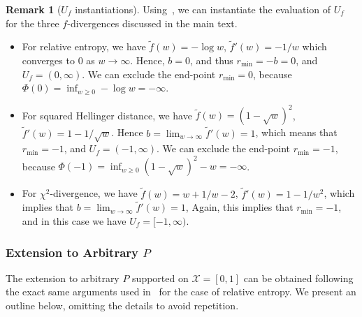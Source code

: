 \documentclass{article}
\theoremstyle{plain}
\theoremstyle{definition}
\newtheorem{remark}[remark]{Remark}
\newcommand{\calX}{\mathcal X}
\newcommand{\ftilde}{\widetilde{f}}
\begin{document}
\begin{remark}[$U_f$ instantiations]
    \label{remark:Uf-examples} 
    Using~, we can instantiate the evaluation of $U_f$ for the three $f$-divergences discussed in the main text. 
    \begin{itemize}
        \item For relative entropy, we have $\ftilde(w) = - \log w$, $\ftilde'(w) = -1/w$ which converges to $0$ as $w \to \infty$. Hence, $b = 0$, and thus $r_{\min} = - b = 0$, and $U_f = (0, \infty)$. We can exclude the end-point $r_{\min}=0$, because $\Phi(0) = \inf_{w \geq 0} - \log w = -\infty$. 

        \item For squared Hellinger distance, we have $\ftilde(w) = (1-\sqrt{w})^2$, $\ftilde'(w)= 1 - 1/\sqrt{w}$. Hence $b = \lim_{ w \to \infty} \ftilde'(w) = 1$, which means that $r_{\min} = -1$, and $U_f = (-1, \infty)$. We can exclude the end-point $r_{\min}=-1$, because $\Phi(-1) = \inf_{w \geq 0} (1-\sqrt{w})^2 - w = -\infty$. 
        
        \item For $\chi^2$-divergence, we have $\ftilde(w) = w + 1/w - 2$, $\ftilde'(w) = 1 - 1/w^2$, which implies that $b = \lim_{w \to \infty} \ftilde'(w) = 1$, Again, this implies that $r_{\min} = -1$, and in this case we have $U_f = [-1, \infty)$. 
    \end{itemize}
\end{remark}

\subsubsection{Extension to Arbitrary $P$}
\label{proof:f-divergence-extension}
The extension to arbitrary $P$ supported on $\calX = [0,1]$ can be obtained following the exact same arguments used in~ for the case of relative entropy.  We present an outline below, omitting the details to avoid repetition. 
\end{document}
